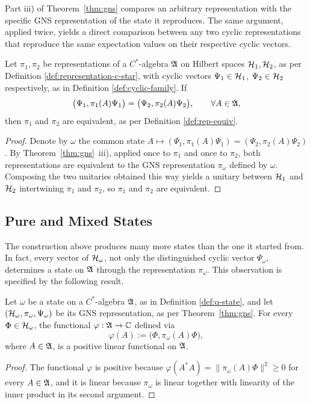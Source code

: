 Part iii) of Theorem~\ref{thm:gns} compares an arbitrary representation with the specific GNS representation of the state it reproduces. The same argument, applied twice, yields a direct comparison between any two cyclic representations that reproduce the same expectation values on their respective cyclic vectors.

\begin{corollary}
	\label{cor:cyclic-representations-same-expectations}
	Let $\pi_1,\pi_2$ be representations of a $C^*$-algebra $\mathfrak{A}$ on Hilbert spaces $\H_1,\H_2$, as per Definition \ref{def:representation-c-star}, with cyclic vectors $\Psi_1 \in \H_1$, $\Psi_2 \in \H_2$ respectively, as in Definition \ref{def:cyclic-family}. If
	\begin{equation}
		\big(\Psi_1,\pi_1(A)\Psi_1\big) = \big(\Psi_2,\pi_2(A)\Psi_2\big), \qquad \forall A \in \mathfrak{A},
	\end{equation}
	then $\pi_1$ and $\pi_2$ are equivalent, as per Definition \ref{def:rep-equiv}.
\end{corollary}

\begin{proof}
	Denote by $\omega$ the common state $A \mapsto (\Psi_1,\pi_1(A)\Psi_1) = (\Psi_2,\pi_2(A)\Psi_2)$. By Theorem~\ref{thm:gns}~iii), applied once to $\pi_1$ and once to $\pi_2$, both representations are equivalent to the GNS representation $\pi_\omega$ defined by $\omega$. Composing the two unitaries obtained this way yields a unitary between $\H_1$ and $\H_2$ intertwining $\pi_1$ and $\pi_2$, so $\pi_1$ and $\pi_2$ are equivalent.
\end{proof}

\subsection*{Pure and Mixed States}
The construction above produces many more states than the one it started from. In fact, every vector of $\H_\omega$, not only the distinguished cyclic vector $\Psi_\omega$, determines a state on $\mathfrak{A}$ through the representation $\pi_\omega$. This observation is specified by the following result.

\begin{proposition}\label{prop:state-vector}
	Let $\omega$ be a state on a $C^*$-algebra $\mathfrak{A}$, as in Definition \ref{def:q-state}, and let $(\H_\omega, \pi_\omega, \Psi_\omega)$ be its GNS representation, as per Theorem~\ref{thm:gns}. For every $\Phi \in \H_\omega$, the functional $\varphi: \mathfrak{A} \to \mathbb{C}$ defined via
	\begin{equation}
		\varphi(A) := \big(\Phi, \pi_\omega(A)\Phi\big),
	\end{equation}
	where $A \in \mathfrak{A}$, is a positive linear functional on $\mathfrak{A}$. 
\end{proposition}
\begin{proof}
	The functional $\varphi$ is positive because $\varphi(A^*A) = \|\pi_\omega(A)\Phi\|^2 \ge 0$ for every $A \in \mathfrak{A}$, and it is linear because $\pi_\omega$ is linear together with linearity of the inner product in its second argument. 
\end{proof}

